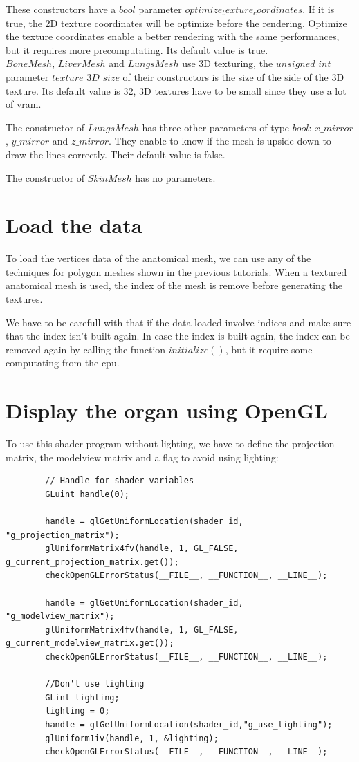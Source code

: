 \documentclass[12pt]{report}
\begin{document}
	These constructors have a $bool$ parameter $optimize_texture_coordinates$. If it is true, the 2D texture coordinates will be optimize before the rendering. Optimize the texture coordinates enable a better rendering with the same performances, but it requires more precomputating. Its default value is true. \\
	
	$BoneMesh$, $LiverMesh$ and $LungsMesh$ use 3D texturing, the $unsigned$ $int$ parameter $texture\_3D\_size$ of their constructors is the size of the side of the 3D texture. Its default value is $32$, 3D textures have to be small since they use a lot of vram.
		
	The constructor of $LungsMesh$ has three other parameters of type $bool$: $x\_mirror$, $y\_mirror$ and $z\_mirror$. They enable to know if the mesh is upside down to draw the lines correctly. Their default value is false.

	The constructor of $SkinMesh$ has no parameters.

\chapter{Load the data}

To load the vertices data of the anatomical mesh, we can use any of the techniques for polygon meshes shown in the previous tutorials. When a textured anatomical mesh is used, the index of the mesh is remove before generating the textures.

	We have to be carefull with that if the data loaded involve indices and make sure that the index isn't built again. In case the index is built again, the index can be removed again by calling the function $initialize()$, but it require some computating from the cpu.

\chapter{Display the organ using OpenGL}

To use this shader program without lighting, we have to define the projection matrix, the modelview matrix and a flag to avoid using lighting:

\begin{lstlisting}
        // Handle for shader variables
    	GLuint handle(0);

    	handle = glGetUniformLocation(shader_id, "g_projection_matrix");
        glUniformMatrix4fv(handle, 1, GL_FALSE, g_current_projection_matrix.get());
        checkOpenGLErrorStatus(__FILE__, __FUNCTION__, __LINE__);

        handle = glGetUniformLocation(shader_id, "g_modelview_matrix");
        glUniformMatrix4fv(handle, 1, GL_FALSE, g_current_modelview_matrix.get());
        checkOpenGLErrorStatus(__FILE__, __FUNCTION__, __LINE__);

        //Don't use lighting
        GLint lighting;
        lighting = 0;
        handle = glGetUniformLocation(shader_id,"g_use_lighting");
        glUniform1iv(handle, 1, &lighting);
        checkOpenGLErrorStatus(__FILE__, __FUNCTION__, __LINE__);
\end{lstlisting}
\end{document}
